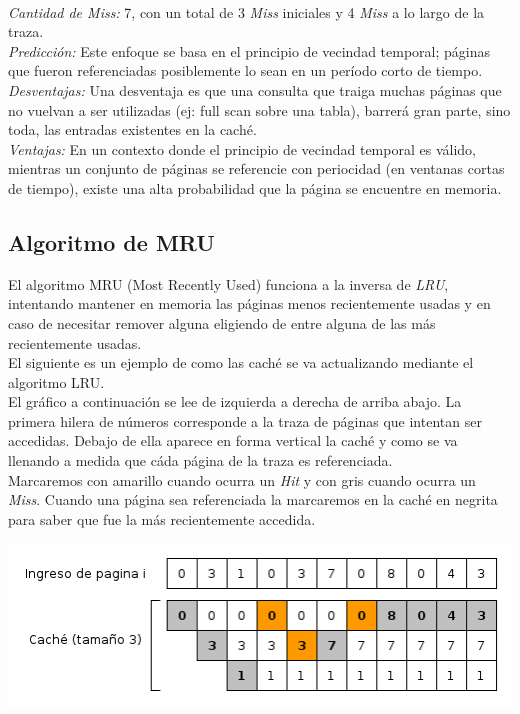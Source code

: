 \documentclass[11pt, a4paper, spanish]{article}
\begin{document}
 \\
\emph{Cantidad de Miss:} 7, con un total de 3 \emph{Miss} iniciales y 4 \emph{Miss} a lo largo de la traza.\\
\emph{Predicci\'on:} Este enfoque se basa en el principio de vecindad temporal; p\'aginas que fueron referenciadas posiblemente lo sean en un per\'iodo corto de tiempo.\\
\emph{Desventajas:} Una desventaja es que una consulta que traiga muchas p\'aginas que no vuelvan a ser utilizadas (ej: full scan sobre una tabla), barrer\'a gran parte, sino toda, las entradas existentes en la cach\'e.\\
\emph{Ventajas:} En un contexto donde el principio de vecindad temporal es v\'alido, mientras un conjunto de p\'aginas se referencie con 
periocidad (en ventanas cortas de tiempo), existe una alta probabilidad que la p\'agina se encuentre en memoria.\\

\newpage
\subsection{Algoritmo de MRU}

El algoritmo MRU (Most Recently Used) funciona a la inversa de \textit{LRU}, intentando mantener en memoria las p\'aginas menos recientemente usadas
y en caso de necesitar remover alguna eligiendo de entre alguna de las m\'as recientemente usadas.\\

El siguiente es un ejemplo de como las cach\'e se va actualizando mediante el algoritmo LRU.\\

El gr\'afico a continuaci\'on se lee de izquierda a derecha de arriba abajo. La primera hilera de n\'umeros corresponde a la traza de p\'aginas que intentan ser 
accedidas. Debajo de ella aparece en forma vertical la cach\'e y como se va llenando a medida que c\'ada p\'agina de la traza es referenciada.\\ 

Marcaremos con amarillo cuando ocurra un \textit{Hit} y con gris cuando ocurra un \textit{Miss}.
Cuando una p\'agina sea referenciada la marcaremos en la cach\'e en negrita para saber que fue la m\'as recientemente accedida.\\

\begin{center}
		\includegraphics[scale=0.65]{diagramas/MRUAlgorithm.png}\\
\end{center}
\end{document}
